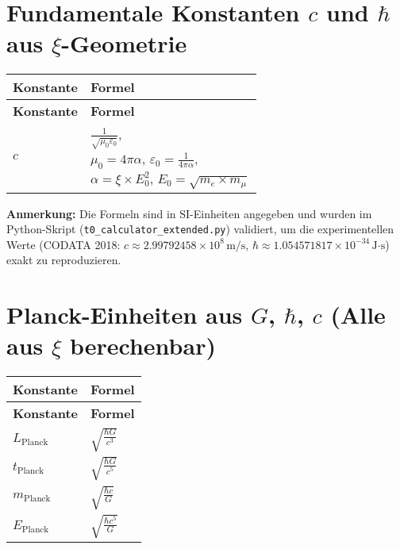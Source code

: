 \documentclass[12pt,a4paper]{article}
\begin{document}
	\section{Fundamentale Konstanten $c$ und $\hbar$ aus $\xi$-Geometrie}
	\begin{longtable}{|p{5cm}|p{6cm}|}
		\hline
		\textbf{Konstante} & \textbf{Formel} \\
		\hline
		\endfirsthead
		\hline
		\textbf{Konstante} & \textbf{Formel} \\
		\hline
		\endhead
		$c$ & \parbox{6cm}{\centering $\frac{1}{\sqrt{\mu_0 \varepsilon_0}}$, \\ $\mu_0 = 4\pi\alpha$, $\varepsilon_0 = \frac{1}{4\pi\alpha}$, \\ $\alpha = \xi \times E_0^2$, $E_0 = \sqrt{m_e \times m_\mu}$} \\
		\hline
		$\hbar$ & $\frac{e^2}{4\pi \alpha^2 c \varepsilon_0}$ \\
		\hline
	\end{longtable}
	
	\textbf{Anmerkung:} Die Formeln sind in SI-Einheiten angegeben und wurden im Python-Skript (\texttt{t0\_calculator\_extended.py}) validiert, um die experimentellen Werte (CODATA 2018: $c \approx 2.99792458 \times 10^8 \, \text{m/s}$, $\hbar \approx 1.054571817 \times 10^{-34} \, \text{J·s}$) exakt zu reproduzieren.
	
	\section{Planck-Einheiten aus $G$, $\hbar$, $c$ (Alle aus $\xi$ berechenbar)}
	\begin{longtable}{|p{5cm}|p{6cm}|}
		\hline
		\textbf{Konstante} & \textbf{Formel} \\
		\hline
		\endfirsthead
		\hline
		\textbf{Konstante} & \textbf{Formel} \\
		\hline
		\endhead
		$L_{\text{Planck}}$ & $\sqrt{\frac{\hbar G}{c^{3}}}$ \\
		\hline
		$t_{\text{Planck}}$ & $\sqrt{\frac{\hbar G}{c^{5}}}$ \\
		\hline
		$m_{\text{Planck}}$ & $\sqrt{\frac{\hbar c}{G}}$ \\
		\hline
		$E_{\text{Planck}}$ & $\sqrt{\frac{\hbar c^{5}}{G}}$ \\
		\hline
	\end{longtable}
	
\end{document}
